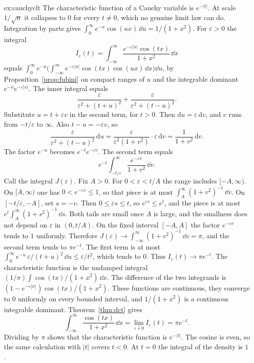 \begin{solution}{ex:cauchyclt}
\idea The characteristic function of a Cauchy variable is $e^{-|t|}$. At scale $1/\sqrt n$ it collapses to $0$ for every $t\ne0$, which no genuine limit law can do.
\writeup Integration by parts gives $\int_0^\infty e^{-u}\cos(ux)\,\dd u=1/(1+x^2)$. For $\varepsilon>0$ the integral
\[
 I_\varepsilon(t)=\int_{-\infty}^{\infty}\frac{e^{-\varepsilon|x|}\cos(tx)}{1+x^2}\,\dd x
\]
equals $\int_0^\infty e^{-u}\bigl(\int_{-\infty}^{\infty}e^{-\varepsilon|x|}\cos(tx)\cos(ux)\,\dd x\bigr)\dd u$, by Proposition~\ref{prop:fubini} on compact ranges of $u$ and the integrable dominant $e^{-u}e^{-\varepsilon|x|}$. The inner integral equals
\[
 \frac{\varepsilon}{\varepsilon^2+(t+u)^2}+\frac{\varepsilon}{\varepsilon^2+(t-u)^2}.
\]
Substitute $u=t+\varepsilon v$ in the second term, for $t>0$. Then $\mathrm du=\varepsilon\,\mathrm dv$, and $v$ runs from $-t/\varepsilon$ to $\infty$. Also $t-u=-\varepsilon v$, so
\[
 \frac{\varepsilon}{\varepsilon^2+(t-u)^2}\,\mathrm du=\frac{\varepsilon}{\varepsilon^2(1+v^2)}\cdot\varepsilon\,\mathrm dv=\frac{1}{1+v^2}\,\mathrm dv.
\]
The factor $e^{-u}$ becomes $e^{-t}e^{-\varepsilon v}$. The second term equals
\[
 e^{-t}\int_{-t/\varepsilon}^{\infty}\frac{e^{-\varepsilon v}}{1+v^2}\,\dd v.
\]
Call the integral $J(\varepsilon)$. Fix $A>0$. For $0<\varepsilon<t/A$ the range includes $[-A,\infty)$. On $[A,\infty)$ one has $0<e^{-\varepsilon v}\le1$, so that piece is at most $\int_A^{\infty}(1+v^2)^{-1}\,\dd v$. On $[-t/\varepsilon,-A]$, set $s=-v$. Then $0\le\varepsilon s\le t$, so $e^{\varepsilon s}\le e^{t}$, and the piece is at most $e^{t}\int_A^{\infty}(1+s^2)^{-1}\,\dd s$. Both tails are small once $A$ is large, and the smallness does not depend on $\varepsilon$ in $(0,t/A)$. On the fixed interval $[-A,A]$ the factor $e^{-\varepsilon v}$ tends to $1$ uniformly. Therefore $J(\varepsilon)\to\int_{-\infty}^{\infty}(1+v^2)^{-1}\,\dd v=\pi$, and the second term tends to $\pi e^{-t}$. The first term is at most $\int_0^{\infty}e^{-u}\,\varepsilon/(t+u)^2\,\dd u\le\varepsilon/t^2$, which tends to $0$. Thus $I_\varepsilon(t)\to\pi e^{-t}$. The characteristic function is the undamped integral $(1/\pi)\int\cos(tx)/(1+x^2)\,\dd x$. The difference of the two integrands is $(1-e^{-\varepsilon|x|})\cos(tx)/(1+x^2)$. These functions are continuous, they converge to $0$ uniformly on every bounded interval, and $1/(1+x^2)$ is a continuous integrable dominant. Theorem~\ref{thm:dct} gives
\[
 \int_{-\infty}^{\infty}\frac{\cos(tx)}{1+x^2}\,\dd x=\lim_{\varepsilon\downarrow0}I_\varepsilon(t)=\pi e^{-t}.
\]
Dividing by $\pi$ shows that the characteristic function is $e^{-|t|}$. The cosine is even, so the same calculation with $|t|$ covers $t<0$. At $t=0$ the integral of the density is $1$.


\end{solution}

